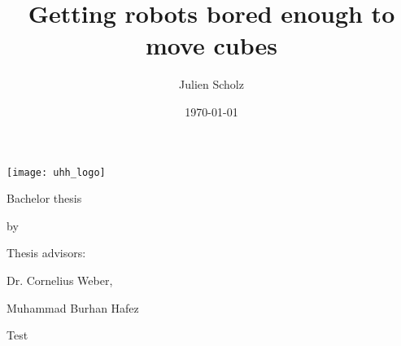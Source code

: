 \documentclass{article}
\title{Getting robots bored enough to move cubes}
\author{Julien Scholz}
\date{\today}
\begin{document}
\begin{titlepage}
    \centering
    \texttt{[image: uhh\_logo]}\par
    \vspace{4\baselineskip}
    {\Large Bachelor thesis\par}
    {\Huge \thetitle \par}
    \vspace{4\baselineskip}
    by\par
    {\Large \theauthor \par}
    \vspace{8\baselineskip}
    \vfill
    Thesis advisors:\par
    {\large Dr. Cornelius Weber, \par Muhammad Burhan Hafez}
\end{titlepage}

\tableofcontents

Test
\end{document}
